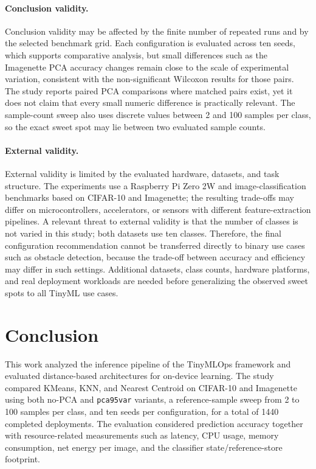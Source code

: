 \documentclass[sigconf,review]{acmart}
\begin{document}
\paragraph{Conclusion validity.}
Conclusion validity may be affected by the finite number of repeated runs and by the selected benchmark grid.
Each configuration is evaluated across ten seeds, which supports comparative analysis, but small differences such as the Imagenette PCA accuracy changes remain close to the scale of experimental variation, consistent with the non-significant Wilcoxon results for those pairs.
The study reports paired PCA comparisons where matched pairs exist, yet it does not claim that every small numeric difference is practically relevant.
The sample-count sweep also uses discrete values between 2 and 100 samples per class, so the exact sweet spot may lie between two evaluated sample counts.

\paragraph{External validity.}
External validity is limited by the evaluated hardware, datasets, and task structure.
The experiments use a Raspberry Pi Zero 2W and image-classification benchmarks based on CIFAR-10 and Imagenette; the resulting trade-offs may differ on microcontrollers, accelerators, or sensors with different feature-extraction pipelines.
A relevant threat to external validity is that the number of classes is not varied in this study; both datasets use ten classes.
Therefore, the final configuration recommendation cannot be transferred directly to binary use cases such as obstacle detection, because the trade-off between accuracy and efficiency may differ in such settings.
Additional datasets, class counts, hardware platforms, and real deployment workloads are needed before generalizing the observed sweet spots to all TinyML use cases.

\section{Conclusion}
\label{sec:conclusion}
This work analyzed the inference pipeline of the TinyMLOps framework and evaluated distance-based architectures for on-device learning.
The study compared KMeans, KNN, and Nearest Centroid on CIFAR-10 and Imagenette using both no-PCA and \texttt{pca95var} variants, a reference-sample sweep from 2 to 100 samples per class, and ten seeds per configuration, for a total of 1440 completed deployments.
The evaluation considered prediction accuracy together with resource-related measurements such as latency, CPU usage, memory consumption, net energy per image, and the classifier state/reference-store footprint.
\end{document}
